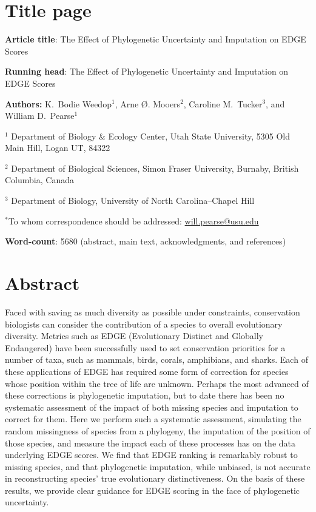 \documentclass[12pt,english]{article}
\begin{document}
\setlength{\parindent}{0pt}
\section*{Title page}

\textbf{Article title}: The Effect of Phylogenetic Uncertainty and Imputation on EDGE Scores

\textbf{Running head}: The Effect of Phylogenetic Uncertainty and Imputation on EDGE Scores

\textbf{Authors:} K.\ Bodie Weedop$^{1}$, Arne \O. Mooers$^2$, Caroline M.\ Tucker$^3$, and William D.\ Pearse$^{1}$\

$^1$ Department of Biology \& Ecology Center, Utah State University,
5305 Old Main Hill, Logan UT, 84322

$^2$ Department of Biological Sciences, Simon Fraser University, Burnaby,
British Columbia, Canada

$^3$ Department of Biology, University of North Carolina–Chapel Hill

$^*$To whom correspondence should be addressed:
\url{will.pearse@usu.edu}

\textbf{Word-count}: 5680 (abstract, main text, acknowledgments, and
  references)

\clearpage
\section*{Abstract}

Faced with saving as much diversity as possible under constraints, conservation
biologists can consider the contribution of a species to overall evolutionary
diversity. Metrics such as EDGE (Evolutionary Distinct and Globally Endangered)
have been successfully used to set conservation priorities for a number of taxa,
such as mammals, birds, corals, amphibians, and sharks. Each of these
applications of EDGE has required some form of correction for species whose
position within the tree of life are unknown. Perhaps the most advanced of these
corrections is phylogenetic imputation, but to date there has been no systematic
assessment of the impact of both missing species and imputation to correct for
them. Here we perform such a systematic assessment, simulating the random
missingness of species from a phylogeny, the imputation of the position of those
species, and measure the impact each of these processes has on the data
underlying EDGE scores. We find that EDGE ranking is remarkably robust to
missing species, and that phylogenetic imputation, while unbiased, is not
accurate in reconstructing species’ true evolutionary distinctiveness. On the
basis of these results, we provide clear guidance for EDGE scoring in the face
of phylogenetic uncertainty.
\end{document}
